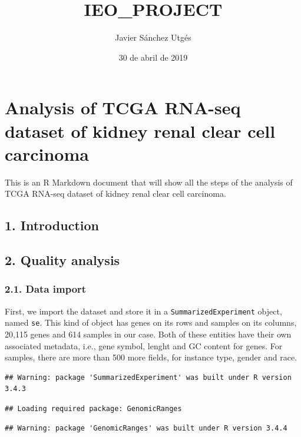 \documentclass[]{article}
\title{IEO\_PROJECT}
\author{Javier Sánchez Utgés}
\date{30 de abril de 2019}
\begin{document}
\maketitle

\section{Analysis of TCGA RNA-seq dataset of kidney renal clear cell
carcinoma}\label{analysis-of-tcga-rna-seq-dataset-of-kidney-renal-clear-cell-carcinoma}

This is an R Markdown document that will show all the steps of the
analysis of TCGA RNA-seq dataset of kidney renal clear cell carcinoma.

\subsection{1. Introduction}\label{introduction}

\subsection{2. Quality analysis}\label{quality-analysis}

\subsubsection{2.1. Data import}\label{data-import}

First, we import the dataset and store it in a
\texttt{SummarizedExperiment} object, named \texttt{se}. This kind of
object has genes on its rows and samples on its columns, 20,115 genes
and 614 samples in our case. Both of these entities have their own
associated metadata, i.e., gene symbol, lenght and GC content for genes.
For samples, there are more than 500 more fields, for instance type,
gender and race.

\begin{verbatim}
## Warning: package 'SummarizedExperiment' was built under R version 3.4.3
\end{verbatim}

\begin{verbatim}
## Loading required package: GenomicRanges
\end{verbatim}

\begin{verbatim}
## Warning: package 'GenomicRanges' was built under R version 3.4.4
\end{verbatim}
\end{document}
